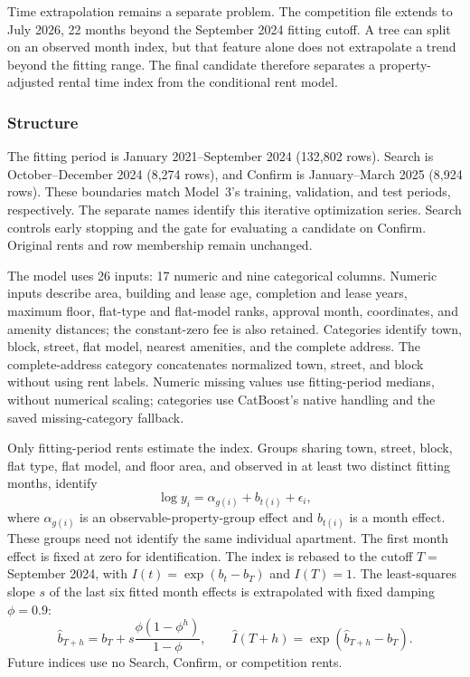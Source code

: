 \documentclass[11pt,a4paper]{article}
\begin{document}
Time extrapolation remains a separate problem.
The competition file extends to July 2026, 22 months beyond the
September 2024 fitting cutoff.
A tree can split on an observed month index, but that feature alone
does not extrapolate a trend beyond the fitting range.
The final candidate therefore separates a property-adjusted rental
time index from the conditional rent model.

\subsubsection{Structure}

The fitting period is January 2021--September 2024
(132{,}802 rows).
Search is October--December 2024 (8{,}274 rows), and Confirm is
January--March 2025 (8{,}924 rows).
These boundaries match Model~3's training, validation, and test
periods, respectively.
The separate names identify this iterative optimization series.
Search controls early stopping and the gate for evaluating a
candidate on Confirm.
Original rents and row membership remain unchanged.

The model uses 26 inputs: 17 numeric and nine categorical columns.
Numeric inputs describe area, building and lease age, completion
and lease years, maximum floor, flat-type and flat-model ranks,
approval month, coordinates, and amenity distances; the
constant-zero fee is also retained.
Categories identify town, block, street, flat model, nearest
amenities, and the complete address.
The complete-address category concatenates normalized town,
street, and block without using rent labels.
Numeric missing values use fitting-period medians, without
numerical scaling; categories use CatBoost's native handling
and the saved missing-category fallback.

Only fitting-period rents estimate the index.
Groups sharing town, street, block, flat type, flat model, and
floor area, and observed in at least two distinct fitting months,
identify
\begin{equation}
\label{eq:model4-fixed-effects}
\log y_i=\alpha_{g(i)}+b_{t(i)}+\epsilon_i,
\end{equation}
where $\alpha_{g(i)}$ is an observable-property-group effect and
$b_{t(i)}$ is a month effect.
These groups need not identify the same individual apartment.
The first month effect is fixed at zero for identification.
The index is rebased to the cutoff $T=$ September 2024, with
$I(t)=\exp(b_t-b_T)$ and $I(T)=1$.
The least-squares slope $s$ of the last six fitted month effects
is extrapolated with fixed damping $\phi=0.9$:
\begin{equation}
\label{eq:model4-index}
\widehat b_{T+h}
=b_T+s\frac{\phi(1-\phi^h)}{1-\phi},
\qquad
\widehat I(T+h)
=\exp(\widehat b_{T+h}-b_T).
\end{equation}
Future indices use no Search, Confirm, or competition rents.
\end{document}
